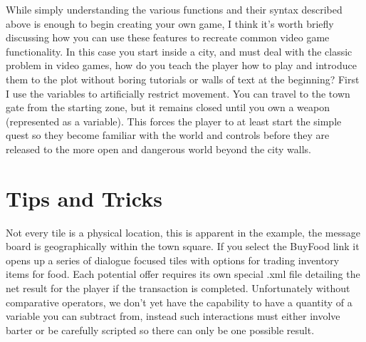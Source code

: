 \documentclass[11pt]{article}
\begin{document}
While simply understanding the various functions and their syntax described above is enough to begin creating your own game, I think it's worth briefly discussing how you can use these features to recreate common video game functionality. In this case you start inside a city, and must deal with the classic problem in video games, how do you teach the player how to play and introduce them to the plot without boring tutorials or walls of text at the beginning? First I use the variables to artificially restrict movement. You can travel to the town gate from the starting zone, but it remains closed until you own a weapon (represented as a variable). This forces the player to at least start the simple quest so they become familiar with the world and controls before they are released to the more open and dangerous world beyond the city walls. 

\section{Tips and Tricks}

Not every tile is a physical location, this is apparent in the example, the message board is geographically within the town square. If you select the BuyFood link it opens up a series of dialogue focused tiles with options for trading inventory items for food. Each potential offer requires its own special .xml file detailing the net result for the player if the transaction is completed. Unfortunately without comparative operators, we don't yet have the capability to have a quantity of a variable you can subtract from, instead such interactions must either involve barter or be carefully scripted so there can only be one possible result.
\end{document}
